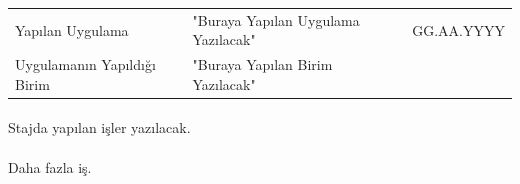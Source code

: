 \documentclass[12pt,a4paper]{report}
\begin{document}
\begin{center}
\begin{tabular}{llr}
\parbox[c]{5cm}{Yapılan Uygulama}
&\parbox[c]{8cm}{"Buraya Yapılan Uygulama Yazılacak"} %
&\parbox[c]{3cm}{GG.AA.YYYY}%
\\
\parbox[c]{5cm}{Uygulamanın Yapıldığı Birim}
&\parbox[c]{8cm}{"Buraya Yapılan Birim Yazılacak"} %
\end{tabular}
\end{center}

\paragraph{} Stajda yapılan işler yazılacak.
\paragraph{} Daha fazla iş.
\end{document}
